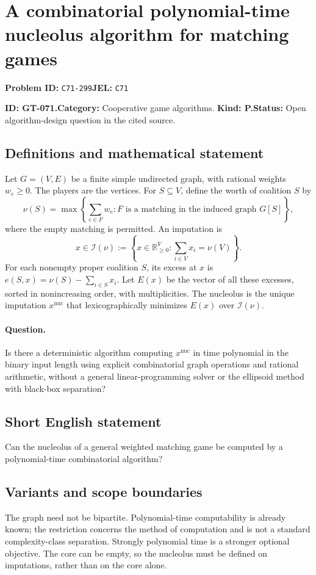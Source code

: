\documentclass[11pt,a4paper]{article}
\begin{document}
\section*{A combinatorial polynomial-time nucleolus algorithm for matching games}
\textbf{Problem ID:} \texttt{C71-299}\quad \textbf{JEL:} \texttt{C71}\par
\label{problem:OP-0201}
\label{game:GT-071}
{\sffamily\small\color{muted}
\noindent\textbf{ID: GT-071.}\quad\textbf{Category:} Cooperative game algorithms.
\quad\textbf{Kind: P.}\quad\textbf{Status:} Open algorithm-design question in the cited source.
\par}
\subsection*{Definitions and mathematical statement}
Let \(G=(V,E)\) be a finite simple undirected graph, with rational
weights \(w_e\geq 0\). The players are the vertices. For \(S\subseteq V\),
define the worth of coalition \(S\) by
\[
 \nu(S)=
 \max\left\{\sum_{e\in F}w_e:
              F\text{ is a matching in the induced graph }G[S]\right\},
\]
where the empty matching is permitted. An imputation is
\[
 x\in\mathcal I(\nu)
   :=\left\{x\in\mathbb R_{\geq 0}^{V}:
                         \sum_{i\in V}x_i=\nu(V)\right\}.
\]
For each nonempty proper coalition \(S\), its excess at \(x\) is
\(e(S,x)=\nu(S)-\sum_{i\in S}x_i\).
Let \(E(x)\) be the vector of all these excesses, sorted in
nonincreasing order, with multiplicities. The nucleolus is the unique
imputation \(x^{\mathrm{nuc}}\) that lexicographically minimizes
\(E(x)\) over \(\mathcal I(\nu)\).

\paragraph{Question.}
Is there a deterministic algorithm computing \(x^{\mathrm{nuc}}\)
in time polynomial in the binary input length using explicit
combinatorial graph operations and rational arithmetic, without a
general linear-programming solver or the ellipsoid method with
black-box separation?

\subsection*{Short English statement}
Can the nucleolus of a general weighted matching game be computed by
a polynomial-time combinatorial algorithm?

\subsection*{Variants and scope boundaries}
The graph need not be bipartite. Polynomial-time computability is already
known; the restriction concerns the method of computation and is not
a standard complexity-class separation. Strongly polynomial time is a
stronger optional objective. The core can be empty, so the nucleolus
must be defined on imputations, rather than on the core alone.
\end{document}
